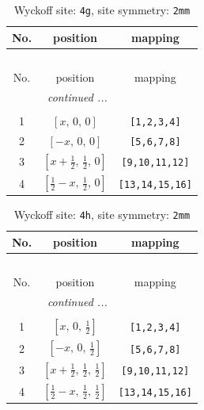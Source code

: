 \documentclass[fleqn,8pt]{jsarticle}
\begin{document}
\renewcommand{\arraystretch}{1.2}
\begin{longtable}{ccc}
\caption{Wyckoff site: {\tt 4g}, site symmetry: {\tt 2mm}}
 \\
 \hline \hline
No. & position & mapping \\ \hline \endfirsthead

\multicolumn{2}{l}{\tablename\ \thetable{}} \\
 \hline \hline
No. & position & mapping \\ \hline \endhead

 \hline \hline
\multicolumn{2}{r}{\footnotesize\it continued ...} \\ \endfoot

 \hline \hline
\multicolumn{2}{r}{} \\ \endlastfoot

1 & $\left[ x,\, 0,\, 0 \right]$ & {\tt [1,2,3,4]} \\ \hline
2 & $\left[ - x,\, 0,\, 0 \right]$ & {\tt [5,6,7,8]} \\ \hline
3 & $\left[ x + \frac{1}{2},\, \frac{1}{2},\, 0 \right]$ & {\tt [9,10,11,12]} \\ \hline
4 & $\left[ \frac{1}{2} - x,\, \frac{1}{2},\, 0 \right]$ & {\tt [13,14,15,16]} \\
\end{longtable}
\renewcommand{\arraystretch}{1.2}
\begin{longtable}{ccc}
\caption{Wyckoff site: {\tt 4h}, site symmetry: {\tt 2mm}}
 \\
 \hline \hline
No. & position & mapping \\ \hline \endfirsthead

\multicolumn{2}{l}{\tablename\ \thetable{}} \\
 \hline \hline
No. & position & mapping \\ \hline \endhead

 \hline \hline
\multicolumn{2}{r}{\footnotesize\it continued ...} \\ \endfoot

 \hline \hline
\multicolumn{2}{r}{} \\ \endlastfoot

1 & $\left[ x,\, 0,\, \frac{1}{2} \right]$ & {\tt [1,2,3,4]} \\ \hline
2 & $\left[ - x,\, 0,\, \frac{1}{2} \right]$ & {\tt [5,6,7,8]} \\ \hline
3 & $\left[ x + \frac{1}{2},\, \frac{1}{2},\, \frac{1}{2} \right]$ & {\tt [9,10,11,12]} \\ \hline
4 & $\left[ \frac{1}{2} - x,\, \frac{1}{2},\, \frac{1}{2} \right]$ & {\tt [13,14,15,16]} \\
\end{longtable}
\end{document}
